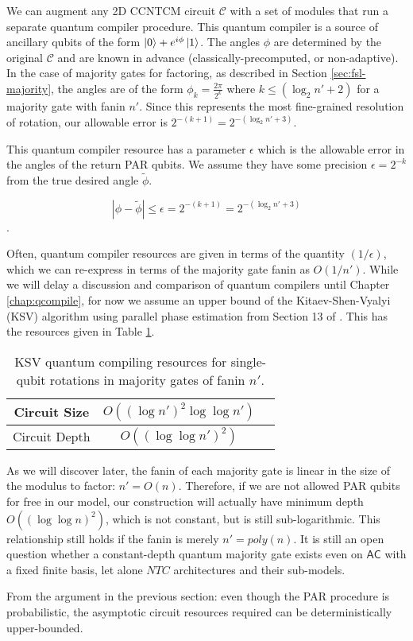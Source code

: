 We can augment any \textsf{2D CCNTCM} circuit $\mathcal{C}$ with a set of modules that run a
separate quantum compiler procedure. This quantum compiler is a source
of ancillary qubits of the form 
$\left\vert{0}\right\rangle + e^{i\phi}\left\vert{1}\right\rangle$. The angles $\phi$ are determined by
the original $\mathcal{C}$ and are known in advance (classically-precomputed,
or non-adaptive). In the case of majority gates for factoring,
as described in Section \ref{sec:fsl-majority}, the angles are of the
form $\phi_k = \frac{2\pi}{2^k}$ where $k \le (\log_2 n' + 2)$ for a majority
gate with fanin $n'$. Since this represents the most fine-grained resolution of
rotation, our allowable error is $2^{-(k+1)} = 2^{-(\log_2 n' + 3)}$.

This quantum compiler resource has a parameter $\epsilon$ which is the
allowable error in the angles of the return PAR qubits.
We assume they have some precision $\epsilon = 2^{-k}$ from the
true desired angle $\tilde{\phi}$.

\begin{equation}
| \phi - \tilde{\phi} | \le \epsilon = 2^{-(k+1)} = 2^{-(\log_2 n' + 3)}
\end{equation}.

Often, quantum compiler resources are given in terms of the quantity
$(1/\epsilon)$, which we can re-express in terms of the
majority gate fanin as $O(1/n')$. 
While we will delay a discussion and comparison of
quantum compilers until Chapter \ref{chap:qcompile}, for now
we assume an upper bound of the Kitaev-Shen-Vyalyi (KSV) algorithm
using parallel phase estimation from Section 13 of \cite{Kitaev2002}.
This has the resources given in Table \ref{tab:fsl-ksv}.

\begin{table}[tbp!]
\begin{tabular}{|c|c|c|}
\hline
Circuit Size & $O((\log n')^2\log\log n')$ \\
\hline
Circuit Depth & $O((\log\log n')^2)$\\
\hline
\end{tabular}
\caption{KSV quantum compiling resources for single-qubit rotations in majority gates of fanin $n'$.}
\label{tab:fsl-ksv}
\end{table}

As we will discover later, the fanin of each majority gate is
linear in the size of the modulus to factor: $n' = O(n)$.
Therefore, if we are not allowed PAR qubits for free in our model,
our construction will actually have minimum depth $O((\log\log n)^2)$,
which is not constant, but is still sub-logarithmic. This relationship still
holds if the fanin is merely $n' = poly(n)$. It is still an
open question \cite{Hoyer2002} whether a constant-depth
quantum majority gate exists even on $\textsf{AC}$ with a fixed finite basis,
let alone
${NTC}$ architectures and their sub-models.

From the argument in the previous section: even though the PAR procedure is
probabilistic, the asymptotic circuit resources required can be
deterministically upper-bounded.